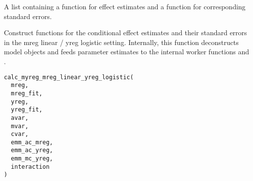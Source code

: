 \documentclass[a4paper]{book}
\begin{document}
%
\begin{Value}
A list containing a function for effect estimates and a function for corresponding standard errors.
\end{Value}
%
\begin{Description}
Construct functions for the conditional effect estimates and their standard errors in the mreg linear / yreg logistic setting. Internally, this function deconstructs model objects and feeds parameter estimates to the internal worker functions  and .
\end{Description}
%
\begin{Usage}
\begin{verbatim}
calc_myreg_mreg_linear_yreg_logistic(
  mreg,
  mreg_fit,
  yreg,
  yreg_fit,
  avar,
  mvar,
  cvar,
  emm_ac_mreg,
  emm_ac_yreg,
  emm_mc_yreg,
  interaction
)
\end{verbatim}
\end{Usage}
%
\end{document}
